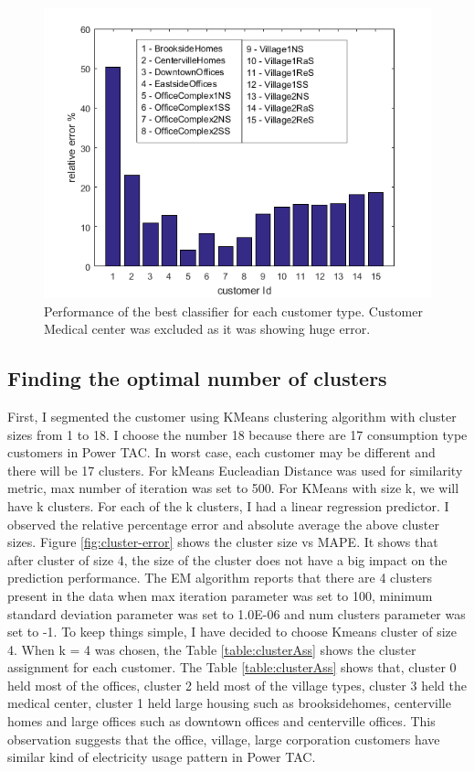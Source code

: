 \begin{figure}[h!]
  \includegraphics{relativeErrorIndivPredictor.png}
  \caption{Performance of the best classifier for each customer type. Customer Medical center was excluded as it was showing huge error. }
  \label{fig:indiv-cutomer-best-predictor-error}
\end{figure}


\subsection{Finding the optimal number of clusters} \label{results}

First, I segmented the customer using KMeans clustering algorithm with cluster sizes from 1 to 18. I choose the number 18 because there are 17 consumption type customers in Power TAC. In worst case, each customer may be different and there will be 17 clusters. For kMeans Eucleadian Distance \cite{witten2005data} was used for similarity metric, max number of iteration \cite{witten2005data} was set to 500. For KMeans with size k, we will have k clusters. For each of the k clusters, I had a linear regression predictor. I observed the relative percentage error and absolute average the above cluster sizes. Figure \ref{fig:cluster-error} shows the cluster size vs MAPE. It shows that after cluster of size 4, the size of the cluster does not have a big impact on the prediction performance. The EM algorithm reports that there are 4 clusters present in the data when max iteration parameter \cite{witten2005data} was set to 100, minimum standard deviation parameter \cite{witten2005data} was set to 1.0E-06 and num clusters parameter \cite{witten2005data} was set to -1. To keep things simple, I have decided to choose Kmeans cluster of size 4.  When k = 4 was chosen, the Table \ref{table:clusterAss} shows the cluster assignment for each customer. The Table \ref{table:clusterAss} shows that, cluster 0 held most of the offices, cluster 2 held most of the village types, cluster 3 held the medical center, cluster 1 held large housing such as brooksidehomes, centerville homes and large offices such as downtown offices and centerville offices. This observation suggests that the office, village, large corporation customers have similar kind of electricity usage pattern in Power TAC.

